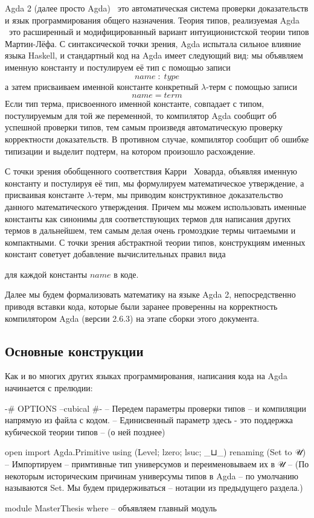 \documentclass{article}[12pt]
\newcommand{\dash}{\textemdash\ }
\begin{document}
Agda 2 (далее просто Agda) \dash это автоматическая система проверки доказательств и язык программирования общего назначения.
Теория типов, реализуемая Agda \dash это расширенный и модифицированный вариант интуиционистской теории типов 
Мартин-Лёфа. С синтаксической точки зрения, Agda испытала сильное влияние языка Haskell, и стандартный
код на Agda имеет следующий вид: мы объявляем именную константу и постулируем её тип с помощью записи
$$ name \; : \; type$$
а затем присваиваем именной константе конкретный $\lambda$-терм с помощью записи
$$ name = term $$
Если тип терма, присвоенного именной константе, совпадает с типом, постулируемым для той же переменной,
то компилятор Agda сообщит об успешной проверки типов, тем самым произведя автоматическую проверку корректности
доказательств. В противном случае, компилятор сообщит об ошибке типизации и выделит подтерм, на котором произошло
расхождение.

С точки зрения обобщенного соответствия Карри \dash Ховарда, объявляя именную константу и постулируя
её тип, мы формулируем математическое утверждение, а присваивая константе $\lambda$-терм,
мы приводим конструктивное доказательство данного математического утверждения. Причем мы можем
использовать именные константы как синонимы для соответствующих термов для написания
других термов в дальнейшем, тем самым делая очень громоздкие термы читаемыми и компактными.
С точки зрения абстрактной теории типов, конструкциям именных констант советует добавление вычислительных 
правил вида
\begin{prooftree}
\end{prooftree}
для каждой константы $name$ в коде.

Далее мы будем формализовать математику на языке Agda 2, непосредственно приводя вставки кода, 
которые были заранее проверенны на корректность компилятором Agda (версии 2.6.3) на этапе сборки этого документа.

\subsection{Основные конструкции}

Как и во многих других языках программирования, написания кода на Agda начинается с прелюдии:
\begin{code}
{-# OPTIONS --cubical #-} -- Передем параметры проверки типов 
-- и компиляции напрямую из файла с кодом.
-- Единисвенный параметр здесь - это поддержка кубической теории типов
-- (о ней позднее)

open import Agda.Primitive using (Level; lzero; lsuc; _⊔_)
                           renaming (Set to 𝒰) -- Импортируем
-- примтивные тип универсумов и переименовываем их в 𝒰
-- (По некоторым историческим причинам универсумы типов в Agda
-- по умолчанию называются Set. Мы будем придерживаться 
-- нотации из предыдущего раздела.)

module MasterThesis where -- объявляем главный модуль
\end{code}
\end{document}
